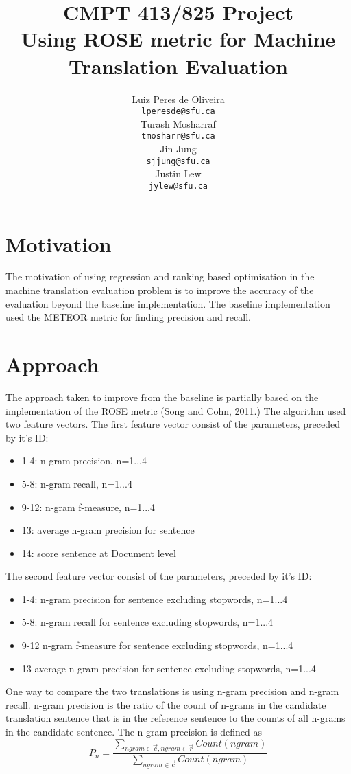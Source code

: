 \documentclass[11pt,letterpaper]{article}
\title{CMPT 413/825 Project\\Using ROSE metric for Machine Translation Evaluation}
\author{Luiz Peres de Oliveira \\
  {\tt lperesde@sfu.ca} \\\And
  Turash Mosharraf \\
  {\tt tmosharr@sfu.ca} \\\And
  Jin Jung \\
  {\tt sjjung@sfu.ca} \\\And
  Justin Lew \\
  {\tt jylew@sfu.ca}
  }
\date{}
\begin{document}
\maketitle
\begin{abstract}

\end{abstract}

\section{Motivation}

The motivation of using regression and ranking based optimisation in the machine translation evaluation problem is to improve the accuracy of the evaluation beyond the baseline implementation. The baseline implementation used the METEOR metric for finding precision and recall.

\section{Approach}

The approach taken to improve from the baseline is partially based on the implementation of the ROSE metric (Song and Cohn, 2011.) The algorithm used two feature vectors. The first feature vector consist of the parameters, preceded by it's ID:
	\begin{itemize}
		\item 1-4: n-gram precision, n=1...4
		\item 5-8: n-gram recall, n=1...4
		\item 9-12: n-gram f-measure, n=1...4
		\item 13: average n-gram precision for sentence
		\item 14: score sentence at Document level
	\end{itemize}
The second feature vector consist of the parameters, preceded by it's ID:
	\begin{itemize}
		\item 1-4: n-gram precision for sentence excluding stopwords, n=1...4
		\item 5-8: n-gram recall for sentence excluding stopwords, n=1...4
		\item 9-12 n-gram f-measure for sentence excluding stopwords, n=1...4
		\item 13 average n-gram precision for sentence excluding stopwords, n=1...4
	\end{itemize}

One way to compare the two translations is using n-gram precision and n-gram recall. n-gram precision is the ratio of the count of n-grams in the candidate translation sentence that is in the reference sentence to the counts of all n-grams in the candidate sentence. The n-gram precision is defined as 
	\[P_{n} = \frac{\sum_{ngram \in \vec{c}, ngram \in \vec{r}} Count(ngram)}{\sum_{ngram\in \vec{c}} Count(ngram)  } \]
\end{document}
